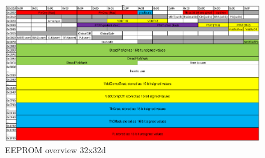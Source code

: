 \documentclass[thesis]{deutez}
\begin{document}
	\begin{figure}[h!]
		\centering
		\includegraphics[width=1\textwidth]{eeprom}
		\caption{EEPROM overview 32x32d\cite{datasheet}}
	\end{figure}
	\FloatBarrier
\end{document}
